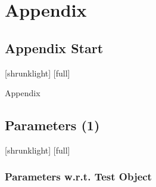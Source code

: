 \documentclass[12pt,compress,aspectratio=169]{beamer} %
\begin{document}
\appendix
\backupbegin
\section{Appendix}

\subsection{Appendix Start}
[shrunklight]
[full]
\begin{frame}
	\centering
	\huge Appendix
\end{frame}

\subsection{Parameters (1)}
[shrunklight]
[full]
\begin{frame}
	\frametitle{Parameters w.r.t. Test Object}
	\centering
	\begin{table}
	\begin{center}
	\end{center}
	\end{table}
\end{frame}
\end{document}
